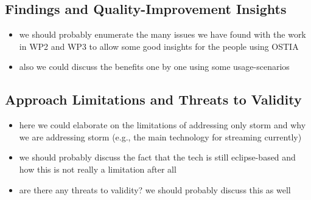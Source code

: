 \subsection{Findings and Quality-Improvement Insights}
\begin{itemize}
\item we should probably enumerate the many issues we have found with the work in WP2 and WP3 to allow some good insights for the people using OSTIA
\item also we could discuss the benefits one by one using some usage-scenarios
\end{itemize}

\subsection{Approach Limitations and Threats to Validity}
\begin{itemize}
\item here we could elaborate on the limitations of addressing only storm and why we are addressing storm (e.g., the main technology for streaming currently)
\item we should probably discuss the fact that the tech is still eclipse-based and how this is not really a limitation after all
\item are there any threats to validity? we should probably discuss this as well
\end{itemize}